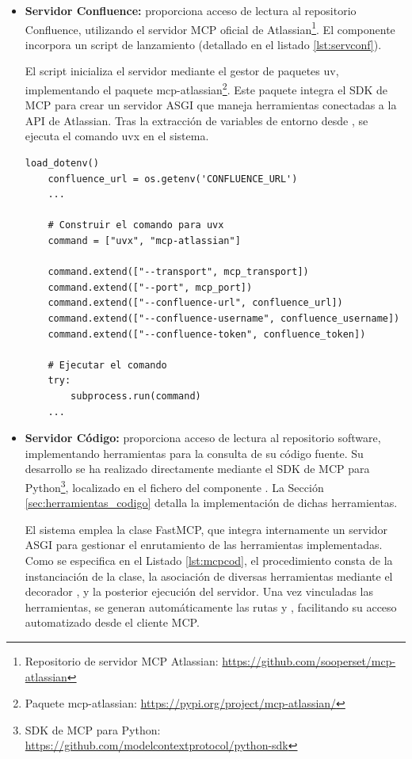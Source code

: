 \begin{itemize}
  \item \textbf{Servidor Confluence:} proporciona acceso de lectura al repositorio Confluence, utilizando el servidor MCP oficial de Atlassian\footnote{Repositorio de servidor MCP Atlassian: \url{https://github.com/sooperset/mcp-atlassian}}. El componente  incorpora un script de lanzamiento  (detallado en el listado \ref{lst:servconf}).

    El script inicializa el servidor mediante el gestor de paquetes uv, implementando el paquete mcp-atlassian\footnote{Paquete mcp-atlassian: \url{https://pypi.org/project/mcp-atlassian/}}. Este paquete integra el SDK de MCP para crear un servidor ASGI que maneja herramientas conectadas a la API de Atlassian. Tras la extracción de variables de entorno desde , se ejecuta el comando uvx en el sistema.
    \begin{lstlisting}[caption={\protect\opus{launch_mcp_server_confluence.py}: ejecución de lanzamiento del servidor MCP Confluence},label={lst:servconf}]
    load_dotenv() 
    confluence_url = os.getenv('CONFLUENCE_URL')
    ...

    # Construir el comando para uvx
    command = ["uvx", "mcp-atlassian"]
    
    command.extend(["--transport", mcp_transport])
    command.extend(["--port", mcp_port]) 
    command.extend(["--confluence-url", confluence_url])
    command.extend(["--confluence-username", confluence_username])
    command.extend(["--confluence-token", confluence_token])

    # Ejecutar el comando
    try:
        subprocess.run(command)
    ...
\end{lstlisting}

\item\textbf{Servidor Código: }proporciona acceso de lectura al repositorio software, implementando herramientas para la consulta de su código fuente. Su desarrollo se ha realizado directamente mediante el SDK de MCP para Python\footnote{SDK de MCP para Python: \url{https://github.com/modelcontextprotocol/python-sdk}}, localizado en el fichero  del componente . La Sección \ref{sec:herramientas_codigo} detalla la implementación de dichas herramientas.

  El sistema emplea la clase FastMCP, que integra internamente un servidor ASGI para gestionar el enrutamiento de las herramientas implementadas. Como se especifica en el Listado \ref{lst:mcpcod}, el procedimiento consta de la instanciación de la clase, la asociación de diversas herramientas mediante el decorador , y la posterior ejecución del servidor. Una vez vinculadas las herramientas, se generan automáticamente las rutas  y , facilitando su acceso automatizado desde el cliente MCP.


\end{itemize}
